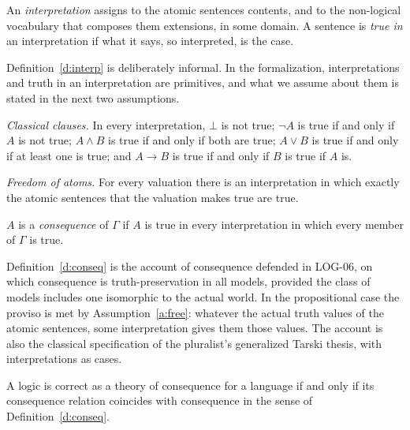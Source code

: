 \documentclass{situationist-preprint}
\begin{document}
\begin{definition}\label{d:interp}
An \emph{interpretation} assigns to the atomic sentences contents, and to the non-logical vocabulary that composes them extensions, in some domain. A sentence is \emph{true in} an interpretation if what it says, so interpreted, is the case.
\end{definition}

Definition~\ref{d:interp} is deliberately informal. In the formalization, interpretations and truth in an interpretation are primitives, and what we assume about them is stated in the next two assumptions.

\begin{assumption}\label{a:clauses}
\emph{Classical clauses.} In every interpretation, $\bot$ is not true; $\neg A$ is true if and only if $A$ is not true; $A \wedge B$ is true if and only if both are true; $A \vee B$ is true if and only if at least one is true; and $A \to B$ is true if and only if $B$ is true if $A$ is.
\end{assumption}

\begin{assumption}\label{a:free}
\emph{Freedom of atoms.} For every valuation there is an interpretation in which exactly the atomic sentences that the valuation makes true are true.
\end{assumption}

\begin{definition}\label{d:conseq}
$A$ is a \emph{consequence} of $\Gamma$ if $A$ is true in every interpretation in which every member of $\Gamma$ is true.
\end{definition}

Definition~\ref{d:conseq} is the account of consequence defended in LOG-06, on which consequence is truth-preservation in all models, provided the class of models includes one isomorphic to the actual world. In the propositional case the proviso is met by Assumption~\ref{a:free}: whatever the actual truth values of the atomic sentences, some interpretation gives them those values. The account is also the classical specification of the pluralist's generalized Tarski thesis, with interpretations as cases.

\begin{principle}[Correctness]\label{p:correct}
A logic is correct as a theory of consequence for a language if and only if its consequence relation coincides with consequence in the sense of Definition~\ref{d:conseq}.
\end{principle}
\end{document}
